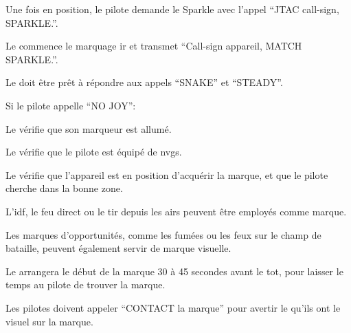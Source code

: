 \begin{e1}
\begin{e2}
\begin{e3}
				\item Une fois en position, le pilote demande le Sparkle avec l'appel ``JTAC call-sign, SPARKLE.''.
				
				\item Le \ja{} commence le marquage \gls{ir} et transmet ``Call-sign appareil, MATCH SPARKLE.''.
				
				\item Le \ja{} doit être prêt à répondre aux appels ``SNAKE'' et ``STEADY''.
				
				\item Si le pilote appelle ``NO JOY'':
				
				\begin{e4}
					
					\item Le \ja{} vérifie que son marqueur est allumé.
					
					\item Le \ja{} vérifie que le pilote est équipé de \glspl{nvg}.
					
					\item Le \ja{} vérifie que l'appareil est en position d'acquérir la marque, et que le pilote cherche dans la bonne zone.
					
				\end{e4}
			
		\end{e3}
		
		
		
		
		\begin{e3}
			
			\item L'\gls{idf}, le feu direct ou le tir depuis les airs peuvent être employés comme marque.
			
			Les marques d'opportunités, comme les fumées ou les feux sur le champ de bataille, peuvent également servir de marque visuelle.
			
			\item Le \ja{} arrangera le début de la marque 30 à 45 secondes avant le \gls{tot}, pour laisser le temps au pilote de trouver la marque.
				
			\item Les pilotes doivent appeler ``CONTACT la marque'' pour avertir le \ja{} qu'ils ont le visuel sur la marque.
				

\end{e3}
\end{e2}
\end{e1}
